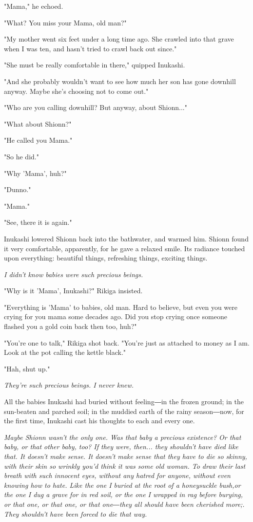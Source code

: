 "Mama," he echoed.

"What? You miss your Mama, old man?"

"My mother went six feet under a long time ago. She crawled into that
grave when I was ten, and hasn't tried to crawl back out since."

"She must be really comfortable in there," quipped Inukashi.~

"And she probably wouldn't want to see how much her son has gone
downhill anyway. Maybe she's choosing not to come out."

"Who are you calling downhill? But anyway, about Shionn..."

"What about Shionn?"

"He called you Mama."

"So he did."

"Why 'Mama', huh?"

"Dunno."

"Mama."

"See, there it is again."

Inukashi lowered Shionn back into the bathwater, and warmed him. Shionn
found it very comfortable, apparently, for he gave a relaxed smile. Its
radiance touched upon everything: beautiful things, refreshing things,
exciting things.

\emph{I didn't know babies were such precious beings.}

"Why is it 'Mama', Inukashi?" Rikiga insisted.

"Everything is 'Mama' to babies, old man. Hard to believe, but even you
were crying for you mama some decades ago. Did you stop crying once
someone flashed you a gold coin back then too, huh?"

"You're one to talk," Rikiga shot back. "You're just as attached to
money as I am. Look at the pot calling the kettle black."

"Hah, shut up."

\emph{They're such precious beings. I never knew.}

All the babies Inukashi had buried without feeling―in the frozen ground;
in the sun-beaten and parched soil; in the muddied earth of the rainy
season―now, for the first time, Inukashi cast his thoughts to each and
every one.

\emph{Maybe Shionn wasn't the only one. Was that baby a precious existence? Or
	that baby, or that other baby, too? If they were, then... they shouldn't
	have died like that. It doesn't make sense. It doesn't make sense that
	they have to die so skinny, with their skin so wrinkly you'd think it
	was some old woman. To draw their last breath with such innocent eyes,
	without any hatred for anyone, without even knowing how to hate. Like
	the one I buried at the root of a honeysuckle bush,or the one I dug a
	grave for in red soil, or the one I wrapped in rag before burying, or
	that one, or that one, or that one―they all should have been cherished
	more;. They shouldn't have been forced to die that way.}

